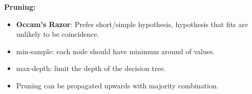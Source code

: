 \documentclass[10pt,landscape]{article}
\begin{document}
\begin{multicols}{3}
\begin{scriptsize}
\textbf{Pruning:}\\
\begin{itemize}
  \item \textbf{Occam's Razor}: Prefer short/simple hypothesis, hypothesis that fits are unlikely to be coincidence.
  \item min-sample: each node should have minimum around of values.
  \item max-depth: limit the depth of the decision tree.
  \item Pruning can be propagated upwards with majority combination.
\end{itemize}


\end{scriptsize}

\end{multicols}
\end{document}
